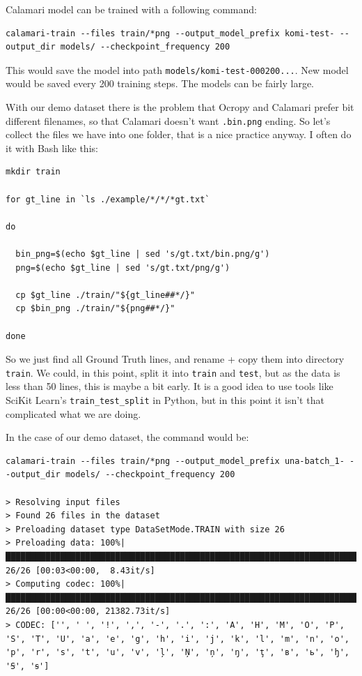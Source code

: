 \documentclass[]{book}
\begin{document}
Calamari model can be trained with a following command:

\begin{verbatim}
calamari-train --files train/*png --output_model_prefix komi-test- --output_dir models/ --checkpoint_frequency 200
\end{verbatim}

This would save the model into path \texttt{models/komi-test-000200...}. New model would be saved every 200 training steps. The models can be fairly large.

With our demo dataset there is the problem that Ocropy and Calamari prefer bit different filenames, so that Calamari doesn't want \texttt{.bin.png} ending. So let's collect the files we have into one folder, that is a nice practice anyway. I often do it with Bash like this:

\begin{verbatim}
mkdir train

for gt_line in `ls ./example/*/*/*gt.txt`

do

  bin_png=$(echo $gt_line | sed 's/gt.txt/bin.png/g')
  png=$(echo $gt_line | sed 's/gt.txt/png/g')

  cp $gt_line ./train/"${gt_line##*/}"
  cp $bin_png ./train/"${png##*/}"

done
\end{verbatim}

So we just find all Ground Truth lines, and rename + copy them into directory \texttt{train}. We could, in this point, split it into \texttt{train} and \texttt{test}, but as the data is less than 50 lines, this is maybe a bit early. It is a good idea to use tools like SciKit Learn's \texttt{train\_test\_split} in Python, but in this point it isn't that complicated what we are doing.

In the case of our demo dataset, the command would be:

\begin{verbatim}
calamari-train --files train/*png --output_model_prefix una-batch_1- --output_dir models/ --checkpoint_frequency 200

> Resolving input files
> Found 26 files in the dataset
> Preloading dataset type DataSetMode.TRAIN with size 26
> Preloading data: 100%|█████████████████████████████████████████████████████████████████████████████████████| 26/26 [00:03<00:00,  8.43it/s]
> Computing codec: 100%|██████████████████████████████████████████████████████████████████████████████████| 26/26 [00:00<00:00, 21382.73it/s]
> CODEC: ['', ' ', '!', ',', '-', '.', ':', 'A', 'H', 'M', 'O', 'P', 'S', 'T', 'U', 'a', 'e', 'g', 'h', 'i', 'j', 'k', 'l', 'm', 'n', 'o', 'p', 'r', 's', 't', 'u', 'v', 'ļ', 'Ņ', 'ņ', 'ŋ', 'ţ', 'в', 'ь', 'ꜧ', 'Ꞩ', 'ꞩ']
\end{verbatim}
\end{document}
